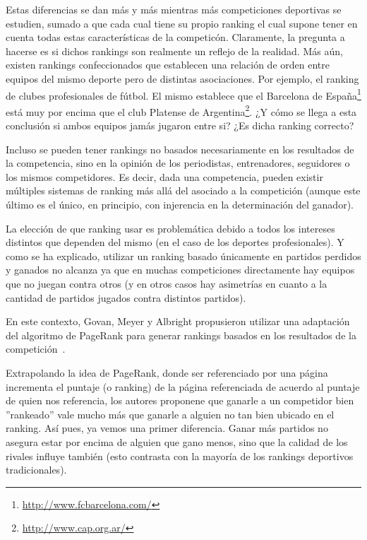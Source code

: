 \par Estas diferencias se dan m\'as y m\'as mientras m\'as competiciones
deportivas se estudien, sumado a que cada cual tiene su propio ranking el cual
supone tener en cuenta todas estas caracter\'isticas de la competic\'on.
Claramente, la pregunta a hacerse es si dichos rankings son realmente un reflejo
de la realidad. M\'as a\'un, existen rankings confeccionados que establecen una
relaci\'on de orden entre equipos del mismo deporte pero de distintas
asociaciones. Por ejemplo, el ranking de clubes profesionales de f\'utbol. El
mismo establece que el Barcelona de
Espa\~na\footnote{\url{http://www.fcbarcelona.com/}} est\'a muy por encima que
el club Platense de Argentina\footnote{\url{http://www.cap.org.ar/}}. ¿Y c\'omo
se llega a esta conclusi\'on si ambos equipos jam\'as jugaron entre si? ¿Es
dicha ranking correcto?

\par Incluso se pueden tener rankings no basados necesariamente en los
resultados de la competencia, sino en la opini\'on de los periodistas,
entrenadores, seguidores o los mismos competidores. Es decir, dada una
competencia, pueden existir m\'ultiples sistemas de ranking m\'as all\'a del
asociado a la competici\'on (aunque este \'ultimo es el \'unico, en principio,
con injerencia en la determinaci\'on del ganador).

\par La elecci\'on de que ranking usar es problem\'atica debido a todos los
intereses distintos que dependen del mismo (en el caso de los deportes
profesionales). Y como se ha explicado, utilizar un ranking basado \'unicamente
en partidos perdidos y ganados no alcanza ya que en muchas competiciones
directamente hay equipos que no juegan contra otros (y en otros casos hay
asimetr\'ias en cuanto a la cantidad de partidos jugados contra distintos
partidos).

\par En este contexto, Govan, Meyer y Albright propusieron utilizar una
adaptaci\'on del algoritmo de PageRank para generar rankings basados en los
resultados de la competici\'on~\cite{Govan2008}.

\par Extrapolando la idea de PageRank, donde ser referenciado por una p\'agina
incrementa el puntaje (o ranking) de la p\'agina referenciada de acuerdo al
puntaje de quien nos referencia, los autores proponene que ganarle a un
competidor bien ''rankeado'' vale mucho m\'as que ganarle a alguien no tan bien
ubicado en el ranking. As\'i pues, ya vemos una primer diferencia. Ganar m\'as
partidos no asegura estar por encima de alguien que gano menos, sino que la
calidad de los rivales influye tambi\'en (esto contrasta con la mayor\'ia de los
rankings deportivos tradicionales).

